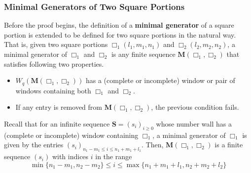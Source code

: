 \documentclass{article}
\theoremstyle{definition}
\numberwithin{equation}{subsection}
\begin{document}
\subsubsection*{Minimal Generators of Two Square Portions}
\noindent Before the proof begins, the definition of a \textbf{minimal generator} of a square portion is extended to be defined for two square portions in the natural way. That is, given two square portions $\Box_1(l_1,m_1,n_1)$ and $\Box_2(l_2,m_2,n_2)$, a minimal generator of $\Box_1$ and $\Box_2$ is any finite sequence $\mathbf{M}(\Box_1,\Box_2)$ that satisfies following two properties. \begin{itemize}
    \item $W_q(\mathbf{M}(\Box_1,\Box_2))$ has a (complete or incomplete) window or pair of windows containing both $\Box_1$ and $\Box_2$.
    \item If any entry is removed from $\mathbf{M}(\Box_1,\Box_2)$, the previous condition fails.
\end{itemize}  
\noindent Recall that for an infinite sequence $\mathbf{S}=(s_i)_{i\ge0}$ whose number wall has a (complete or incomplete) window containing $\Box_1$, a minimal generator of $\Box_1$ is given by the entries $(s_i)_{n_1-m_1\le i \le n_1+m_1+l_1}$. Then, $\mathbf{M}(\Box_1,\Box_2)$ is a finite sequence $(s_i)$ with indices $i$ in the range\begin{equation}\label{min_gen_two}
    \min\{n_1-m_1,n_2-m_2\}\le i \le \max\{n_1+m_1+l_1, n_2+m_2+l_2\}
\end{equation} 
\end{document}
